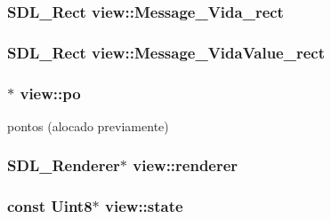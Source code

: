 \subsubsection[{\texorpdfstring{Message\+\_\+\+Vida\+\_\+rect}{Message_Vida_rect}}]{\setlength{\rightskip}{0pt plus 5cm}S\+D\+L\+\_\+\+Rect view\+::\+Message\+\_\+\+Vida\+\_\+rect\hspace{0.3cm}{\ttfamily [private]}}\hypertarget{classview_af1b48d8a8f7f9e16800f9d842717ed2c}{}\label{classview_af1b48d8a8f7f9e16800f9d842717ed2c}
\subsubsection[{\texorpdfstring{Message\+\_\+\+Vida\+Value\+\_\+rect}{Message_VidaValue_rect}}]{\setlength{\rightskip}{0pt plus 5cm}S\+D\+L\+\_\+\+Rect view\+::\+Message\+\_\+\+Vida\+Value\+\_\+rect\hspace{0.3cm}{\ttfamily [private]}}\hypertarget{classview_a1a7059536cb8e091ff7d4a4f2526bcce}{}\label{classview_a1a7059536cb8e091ff7d4a4f2526bcce}
\subsubsection[{\texorpdfstring{po}{po}}]{$\ast$ view\+::po\hspace{0.3cm}{\ttfamily [private]}}\hypertarget{classview_a8dc345a9799a79220ecca66c4cd3e8ff}{}\label{classview_a8dc345a9799a79220ecca66c4cd3e8ff}
pontos (alocado previamente) 
\subsubsection[{\texorpdfstring{renderer}{renderer}}]{\setlength{\rightskip}{0pt plus 5cm}S\+D\+L\+\_\+\+Renderer$\ast$ view\+::renderer\hspace{0.3cm}{\ttfamily [private]}}\hypertarget{classview_a8d7b3ec0a0641d24cdc3b04949f5df45}{}\label{classview_a8d7b3ec0a0641d24cdc3b04949f5df45}
\subsubsection[{\texorpdfstring{state}{state}}]{\setlength{\rightskip}{0pt plus 5cm}const Uint8$\ast$ view\+::state\hspace{0.3cm}{\ttfamily [private]}}\hypertarget{classview_a6fd7fc350d9ad94dfd47e324b107e8ce}{}\label{classview_a6fd7fc350d9ad94dfd47e324b107e8ce}
